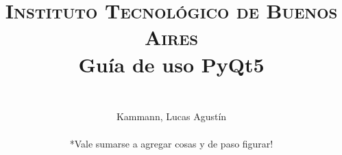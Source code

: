 


    
	\title{
		\normalfont \normalsize \textsc{Instituto Tecnol\'ogico de Buenos Aires} \\ [25pt]
		\huge Guía de uso PyQt5 \\
		\author{
			\\Kammann, Lucas Agust\'in \\
			\\*Vale sumarse a agregar cosas y de paso figurar!\\
		}
	}
	\maketitle
	\newpage

	\tableofcontents

	\newpage
	
